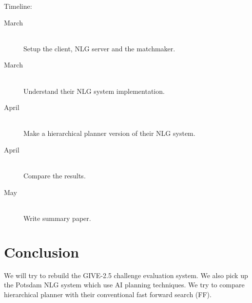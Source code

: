 \documentclass[11pt]{article} %
\begin{document}
\noindent
Timeline:

\begin{description}
  \item[March] \hfill \\
   Setup the client, NLG server and the matchmaker.
  \item[March] \hfill \\
  Understand their NLG system implementation.
  \item[April] \hfill \\
  Make a hierarchical planner version of their NLG system.
  \item[April] \hfill \\
  Compare the results.
  \item[May] \hfill \\
  Write summary paper.
\end{description}

\section{Conclusion}
We will try to rebuild the GIVE-2.5 challenge evaluation system. We also pick up the Potsdam NLG system which use AI planning techniques. We try to compare hierarchical planner with their conventional fast forward search (FF). 




\end{document}
